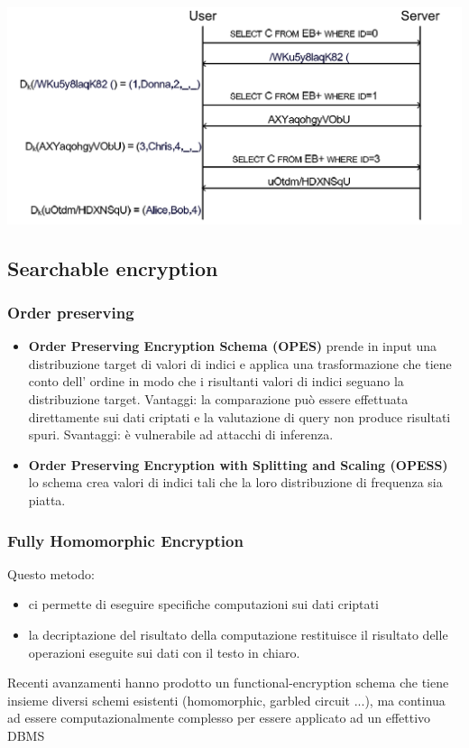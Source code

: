\begin{center}
    \includegraphics[scale=0.4]{img/treeinter.png}
\end{center}

\subsection{Searchable encryption}
\subsubsection{Order preserving}
\begin{itemize}
    \item \textbf{Order Preserving Encryption Schema (OPES)} prende in input una distribuzione target di valori di indici e applica una trasformazione che tiene conto dell' ordine in modo che i risultanti valori di indici seguano la distribuzione target. Vantaggi: la comparazione può essere effettuata direttamente sui dati criptati e la valutazione di query non produce risultati spuri. Svantaggi: è vulnerabile ad attacchi di inferenza.
    \item \textbf{Order Preserving Encryption with Splitting and Scaling (OPESS)} lo schema crea valori di indici tali che la loro distribuzione di frequenza sia piatta.
\end{itemize}
\subsubsection{Fully Homomorphic Encryption}
Questo metodo:
\begin{itemize}
    \item ci permette di eseguire specifiche computazioni sui dati criptati
    \item la decriptazione del risultato della computazione restituisce il risultato delle operazioni eseguite sui dati con il testo in chiaro.
\end{itemize}
Recenti avanzamenti hanno prodotto un functional-encryption schema che tiene insieme diversi schemi esistenti (homomorphic, garbled circuit ...), ma continua ad essere computazionalmente complesso per essere applicato ad un effettivo DBMS

